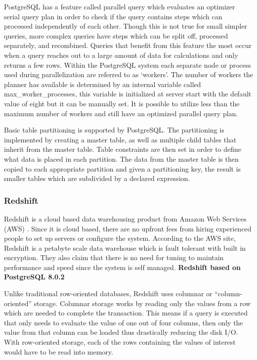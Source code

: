 \documentclass[draftclsnofoot, onecolumn, compsoc, 10pt]{IEEEtran}
\begin{document}
PostgreSQL has a feature called parallel query which evaluates an optimizer serial query plan in order to check if the query contains steps which can processed independently of each other.
Though this is not true for small simpler queries, more complex queries have steps which can be split off, processed separately, and recombined.
Queries that benefit from this feature the most occur when a query reaches out to a large amount of data for calculations and only returns a few rows.
Within the PostgreSQL system each separate node or process used during parallelization are referred to as ‘workers’.
The number of workers the planner has available is determined by an internal variable called max\_worker\_processes, this variable is initialized at server start with the default value of eight but it can be manually set.
It is possible to utilize less than the maximum number of workers and still have an optimized parallel query plan.

Basic table partitioning is supported by PostgreSQL.
The partitioning is implemented by creating a master table, as well as multiple child tables that inherit from the master table.
Table constraints are then set in order to define what data is placed in each partition.
The data from the master table is then copied to each appropriate partition and given a partitioning key, the result is smaller tables which are subdivided by a declared expression.

\subsubsection{Redshift}
Redshift is a cloud based data warehousing product from Amazon Web Services (AWS)
. Since it is cloud based, there are no upfront fees from hiring experienced people to set up servers or configure the system.
According to the  AWS site, Redshift is a petabyte scale data warehouse which is fault tolerant with built in encryption.
They also claim that there is no need for tuning to maintain performance and speed since the system is self managed. \textbf{Redshift based on PostgreSQL 8.0.2}

Unlike traditional row-oriented databases, Redshift uses columnar or “column-oriented” storage.
Columnar storage works by reading only the values from a row which are needed to complete the transaction.
This means if a query is executed that only needs to evaluate the value of one out of four columns, then only the value from that column can be loaded thus drastically reducing the disk I/O.
With row-oriented storage, each of the rows containing the values of interest would have to be read into memory.
\end{document}
